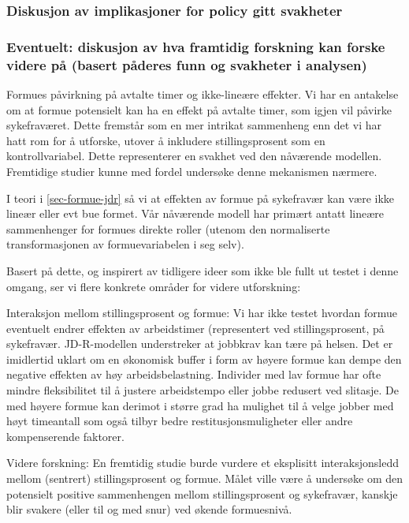 \documentclass[
  12pt,
  a4paper,
  DIV=11,
  numbers=noendperiod]{scrartcl}
\begin{document}
\subsubsection{Diskusjon av implikasjoner for policy gitt
svakheter}\label{diskusjon-av-implikasjoner-for-policy-gitt-svakheter}

\subsubsection{Eventuelt: diskusjon av hva framtidig forskning kan
forske videre på (basert påderes funn og svakheter i
analysen)}\label{eventuelt-diskusjon-av-hva-framtidig-forskning-kan-forske-videre-puxe5-basert-puxe5deres-funn-og-svakheter-i-analysen}

Formues påvirkning på avtalte timer og ikke-lineære effekter. Vi har en
antakelse om at formue potensielt kan ha en effekt på avtalte timer, som
igjen vil påvirke sykefraværet. Dette fremstår som en mer intrikat
sammenheng enn det vi har hatt rom for å utforske, utover å inkludere
stillingsprosent som en kontrollvariabel. Dette representerer en svakhet
ved den nåværende modellen. Fremtidige studier kunne med fordel
undersøke denne mekanismen nærmere.

I teori i \autoref{sec-formue-jdr} så vi at effekten av formue på
sykefravær kan være ikke lineær eller evt bue formet. Vår nåværende
modell har primært antatt lineære sammenhenger for formues direkte
roller (utenom den normaliserte transformasjonen av formuevariabelen i
seg selv).

Basert på dette, og inspirert av tidligere ideer som ikke ble fullt ut
testet i denne omgang, ser vi flere konkrete områder for videre
utforskning:

Interaksjon mellom stillingsprosent og formue: Vi har ikke testet
hvordan formue eventuelt endrer effekten av arbeidstimer (representert
ved stillingsprosent, på sykefravær. JD-R-modellen understreker at
jobbkrav kan tære på helsen. Det er imidlertid uklart om en økonomisk
buffer i form av høyere formue kan dempe den negative effekten av høy
arbeidsbelastning. Individer med lav formue har ofte mindre
fleksibilitet til å justere arbeidstempo eller jobbe redusert ved
slitasje. De med høyere formue kan derimot i større grad ha mulighet til
å velge jobber med høyt timeantall som også tilbyr bedre
restitusjonsmuligheter eller andre kompenserende faktorer.

Videre forskning: En fremtidig studie burde vurdere et eksplisitt
interaksjonsledd mellom (sentrert) stillingsprosent og formue. Målet
ville være å undersøke om den potensielt positive sammenhengen mellom
stillingsprosent og sykefravær, kanskje blir svakere (eller til og med
snur) ved økende formuesnivå.
\end{document}
